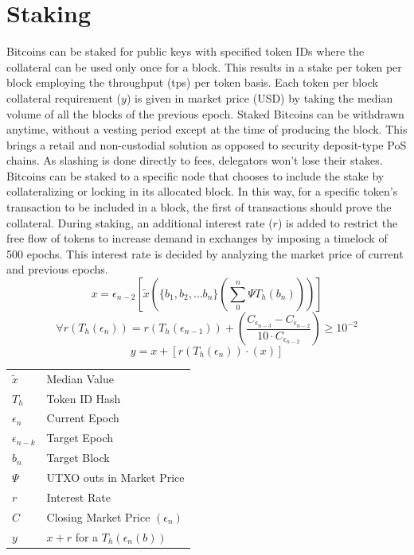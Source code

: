 \documentclass[a4paper,10pt]{article}
\makeatletter
\newenvironment{conditions}
  {\par\vspace{\abovedisplayskip}\noindent\begin{tabular}{>{$}l<{$} @{${}={}$} l}}
  {\end{tabular}\par\vspace{\belowdisplayskip}}
\makeatother
\begin{document}
\section{Staking}
Bitcoins can be staked for public keys with specified token IDs where the collateral can be used only once for a block. This results in a stake per token per block employing the throughput (tps) per token basis. Each token per block collateral requirement ($y$) is given in market price (USD) by taking the median volume of all the blocks of the previous epoch. Staked Bitcoins can be withdrawn anytime, without a vesting period except at the time of producing the block. This brings a retail and non-custodial solution as opposed to security deposit-type PoS chains. As slashing is done directly to fees, delegators won't lose their stakes. Bitcoins can be staked to a specific node that chooses to include the stake by collateralizing or locking in its allocated block. In this way, for a specific token's transaction to be included in a block, the first of transactions should prove the collateral. During staking, an additional interest rate ($r$) is added to restrict the free flow of tokens to increase demand in exchanges by imposing a timelock of 500 epochs. This interest rate is decided by analyzing the market price of current and previous epochs.
\begin{equation*}
x=\epsilon_{n-2}[\widetilde{x}( \{b_1, b_2, \dots b_n\} (\sum_0^n \Psi T_h(b_n)))]
\end{equation*}
\begin{equation*}
\forall r (T_h(\epsilon_n)) =  r(T_h(\epsilon_{n-1}))  +  (\frac{C_{\epsilon_{n-3}} - C_{\epsilon_{n-2}}}{10  \cdot  C_{\epsilon_{n-2}}}) \geq 10^{-2}
\end{equation*}
\begin{equation*}
y=x+ [r (T_h(\epsilon_n)) \cdot (x)]
\end{equation*}
\begin{conditions}
\widetilde{x} & Median Value\\
T_h & Token ID Hash\\
\epsilon_n & Current Epoch\\
\epsilon_{n-k} & Target Epoch\\
b_n & Target Block\\
\Psi & UTXO outs in Market Price\\
r & Interest Rate\\
C & Closing Market Price $(\epsilon_n)$\\
y & $x+r$ for a $T_h(\epsilon_{n}(b))$
\end{conditions}
\end{document}
